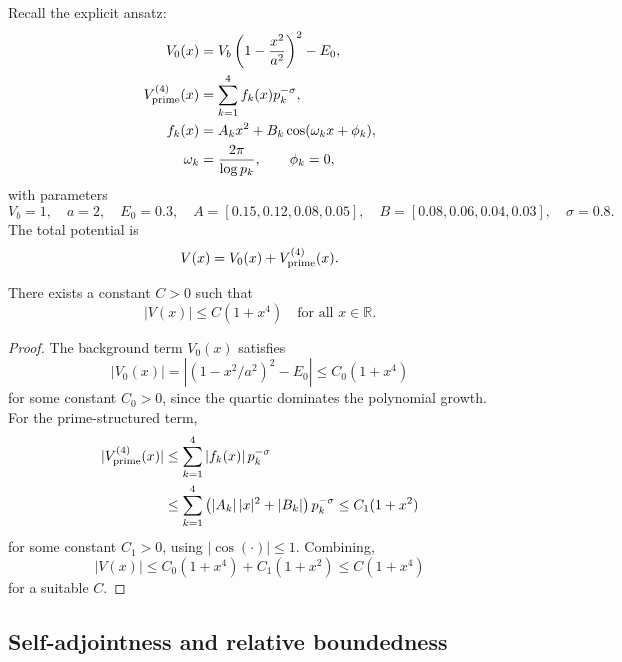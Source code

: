 \documentclass[11pt]{article}
\begin{document}
Recall the explicit ansatz:
\begin{align}
  V_0(x) &= V_b\left(1 - \frac{x^2}{a^2}\right)^2 - E_0,
  \\
  V_{\rm prime}^{(4)}(x)
  &= \sum_{k=1}^{4} f_k(x)p_k^{-\sigma},
  \\
  f_k(x) &= A_k x^2 + B_k \cos(\omega_k x + \phi_k),
  \\
  \omega_k &= \frac{2\pi}{\log p_k},\qquad \phi_k = 0,
\end{align}
with parameters
\begin{equation}
  V_b=1,\quad a=2,\quad E_0=0.3,\quad
  A=[0.15,0.12,0.08,0.05],\quad
  B=[0.08,0.06,0.04,0.03],\quad
  \sigma=0.8.
\end{equation}
The total potential is
\begin{equation}
  V(x) = V_0(x) + V_{\rm prime}^{(4)}(x).
\end{equation}

\begin{lemma}
There exists a constant \(C>0\) such that
\begin{equation}
  |V(x)| \le C(1 + x^4)
  \quad\text{for all } x\in\mathbb{R}.
\end{equation}
\end{lemma}

\begin{proof}
The background term \(V_0(x)\) satisfies
\begin{equation}
  |V_0(x)| = \left|(1 - x^2/a^2)^2 - E_0\right|
  \le C_0 (1 + x^4)
\end{equation}
for some constant \(C_0>0\), since the quartic dominates the polynomial
growth. For the prime-structured term,
\begin{align}
  |V_{\rm prime}^{(4)}(x)|
  &\le \sum_{k=1}^4 |f_k(x)|\,p_k^{-\sigma} \nonumber\\
  &\le \sum_{k=1}^4 \left(|A_k|\,|x|^2 + |B_k|\right)p_k^{-\sigma}
   \le C_1 (1 + x^2)
\end{align}
for some constant \(C_1>0\), using \(|\cos(\cdot)|\le 1\). Combining,
\begin{equation}
  |V(x)|
  \le C_0 (1 + x^4) + C_1 (1 + x^2)
  \le C(1 + x^4)
\end{equation}
for a suitable \(C\).
\end{proof}

\subsection{Self-adjointness and relative boundedness}
\end{document}
